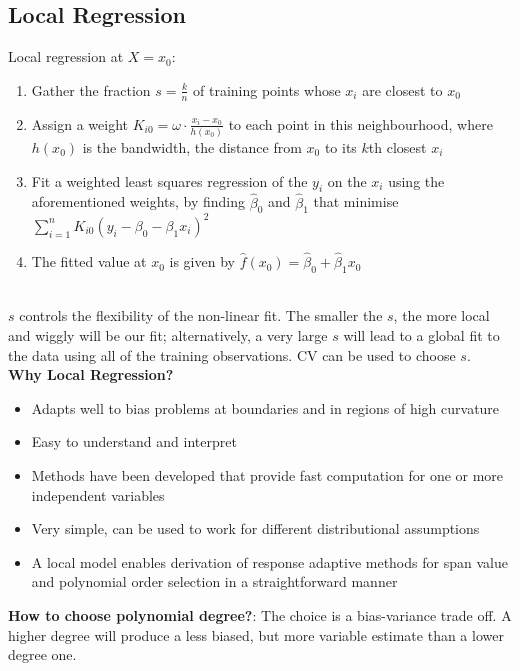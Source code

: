 \documentclass[11pt]{article}
\begin{document}
\subsection{Local Regression}
\noindent Local regression at $X = x_0$:
\begin{enumerate}
    \item Gather the fraction $s=\frac{k}{n}$ of training points whose $x_i$ are closest to $x_0$
    \item Assign a weight $K_{i0} = \omega \cdot \frac{x_i - x_0}{h(x_0)}$ to each point in this neighbourhood, where $h(x_0)$ is the bandwidth, the distance from $x_0$ to its $k$th closest $x_i$
    \item Fit a weighted least squares regression of the $y_i$ on the $x_i$ using the aforementioned weights, by finding $\hat\beta_0$ and $\hat\beta_1$ that minimise $\sum_{i=1}^{n}{K_{i0}(y_i - \beta_0 - \beta_1x_i)^2}$
    \item The fitted value at $x_0$ is given by $\hat{f}(x_0) = \hat\beta_0 + \hat\beta_1 x_0$
\end{enumerate} \phantom{i} \\
\noindent $s$ controls the flexibility of the non-linear fit. The smaller the $s$, the more local and wiggly will be our fit; alternatively, a very large $s$ will lead to a global fit to the data using all of the training observations. CV can be used to choose $s$. \\

\noindent \textbf{Why Local Regression?}
\begin{itemize}
    \item Adapts well to bias problems at boundaries and in regions of high curvature
    \item Easy to understand and interpret
    \item Methods have been developed that provide fast computation for one or more independent variables
    \item Very simple, can be used to work for different distributional assumptions
    \item A local model enables derivation of response adaptive methods for span value and polynomial order selection in a straightforward manner
\end{itemize} \phantom{i}

\noindent \textbf{How to choose polynomial degree?}: The choice is a bias-variance trade off. A higher degree will produce a less biased, but more variable estimate than a lower degree one. \\
\end{document}
